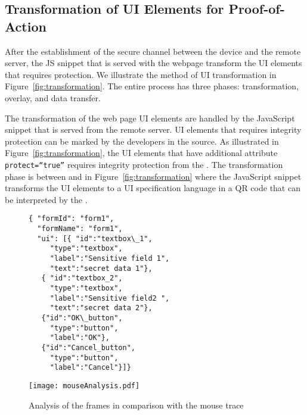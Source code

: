 \subsection{Transformation of UI Elements for Proof-of-Action}
\label{sec:systemDesign:transformation}

After the establishment of the secure channel between the device and the remote server, the \name JS snippet that is served with the webpage transform the UI elements that requires protection. We illustrate the method of UI transformation in Figure~\ref{fig:transformation}. The entire process has three phases: transformation, overlay, and data transfer.

 The transformation of the web page UI elements are handled by the \name JavaScript snippet that is served from the remote server. UI elements that requires integrity protection can be marked by the developers in the \html source. As illustrated in Figure~\ref{fig:transformation}, the \html UI elements that have additional attribute \texttt{protect=``true''} requires integrity protection from the \device. The transformation phase is between \one and \two in Figure~\ref{fig:transformation} where the \name JavaScript snippet transforms the UI elements to a UI specification language in a QR code that can be interpreted by the \device.


\begin{figure}[t]
\begin{lstlisting}[mathescape=true]
{ "formId": "form1",
  "formName": "form1",
  "ui": [{ "id":"textbox\_1",
     "type":"textbox",
     "label":"Sensitive field 1",
     "text":"secret data 1"},
   { "id":"textbox_2",
     "type":"textbox",
     "label":"Sensitive field2 ",
     "text":"secret data 2"},
   {"id":"OK\_button",
     "type":"button",
     "label":"OK"},	
   {"id":"Cancel_button",
     "type":"button",
     "label":"Cancel"}]}
\end{lstlisting}
\end{figure}

\begin{figure}[t]
\centering
\texttt{[image: mouseAnalysis.pdf]}
\caption{Analysis of the frames in comparison with the mouse trace}
\label{fig:mouseAnalysis}
\centering
\end{figure}


